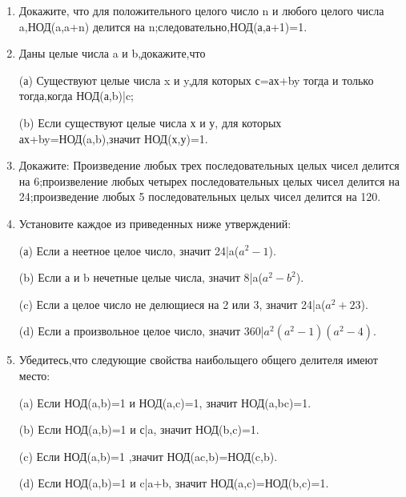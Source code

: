 \documentclass[11pt]{article}
\begin{document}
\begin{enumerate}
\item Докажите, что для положительного целого число n и любого целого числа a,НОД(a,a+n) делится на n;следовательно,НОД(а,а+1)=1.

\item Даны целые числа a и b,докажите,что
\begin{flushleft}
	(а) Существуют целые числа x и y,для которых с=ах+by тогда и только тогда,когда НОД(а,b)|c;
\end{flushleft}
\begin{flushleft}
	(b) Если существуют целые числа х и у, для которых ах+by=НОД(a,b),значит НОД(х,у)=1.
\end{flushleft}
\item Докажите: Произведение любых трех последовательных целых чисел делится на 6;произвеление любых четырех последовательных целых чисел делится на 24;произведение любых 5 последовательных целых чисел делится на 120.
\item Установите каждое из приведенных ниже утверждений:
\begin{flushleft}
	(а) Если а неетное целое число, значит 24|a($a^{2}-1$).
\end{flushleft}
\begin{flushleft}
	(b) Если а и b нечетные целые числа, значит 8|a($a^{2}-b^{2}$).
\end{flushleft}
\begin{flushleft}
	(c) Если а целое число не делющиеся на 2 или 3, значит 24|a($a^{2}+23$).
\end{flushleft}
\begin{flushleft}
	(d) Если а произвольное целое число, значит 360|$a^{2}(a^{2}-1)(a^{2}-4)$.
\end{flushleft}

\item Убедитесь,что следующие свойства наибольщего общего делителя имеют место:
\begin{flushleft}
	(a) Если НОД(a,b)=1 и НОД(a,c)=1, значит НОД(a,bc)=1.
\end{flushleft}
\begin{flushleft}
	(b) Если НОД(a,b)=1 и с|a, значит НОД(b,c)=1.
\end{flushleft}\begin{flushleft}
	(c) Если НОД(a,b)=1 ,значит НОД(ac,b)=НОД(c,b).
\end{flushleft}
\begin{flushleft}
	(d) Если НОД(a,b)=1 и c|a+b, значит НОД(a,c)=НОД(b,c)=1.
\end{flushleft}

\end{enumerate}
\end{document}
